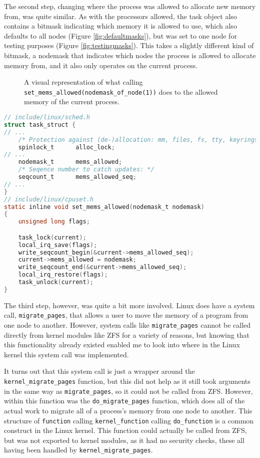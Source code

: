 The second step, changing where the process was allowed to allocate new memory from, was quite similar.
As with the processors allowed, the task object also contains a bitmask indicating which memory it is allowed to use,
which also defaults to all nodes (Figure \ref{fig:defaultmasks}),
but was set to one node for testing purposes (Figure \ref{fig:testingmasks}).
This takes a slightly different kind of bitmask, a nodemask that indicates which nodes the process is allowed
to allocate memory from, and it also only operates on the current process.

\begin{figure}[H]
    \centering
    \resizebox{0.5\linewidth}{!}{}
    \captionsetup{width=0.5\linewidth}
    \caption{A visual representation of what calling \texttt{set\_mems\_allowed(nodemask\_of\_node(1))}
    does to the allowed memory of the current process.}
    \label{fig:setmemsallowed1}
\end{figure}

\singlespacing
\begin{lstlisting}[caption={The relevant chapters of Linux's scheduler code that handle the nodemask
indicating where a process is allowed to allocate memory},label={lst:linux_set_mems_allowed},language=C]
// include/linux/sched.h
struct task_struct {
// ...
	/* Protection against (de-)allocation: mm, files, fs, tty, keyrings, mems_allowed, mempolicy: */
	spinlock_t      alloc_lock;
// ...
	nodemask_t      mems_allowed;
	/* Seqence number to catch updates: */
	seqcount_t      mems_allowed_seq;
// ...
}
// include/linux/cpuset.h
static inline void set_mems_allowed(nodemask_t nodemask)
{
	unsigned long flags;

	task_lock(current);
	local_irq_save(flags);
	write_seqcount_begin(&current->mems_allowed_seq);
	current->mems_allowed = nodemask;
	write_seqcount_end(&current->mems_allowed_seq);
	local_irq_restore(flags);
	task_unlock(current);
}
\end{lstlisting}
\doublespacing
The third step, however, was quite a bit more involved.
Linux does have a system call, \texttt{migrate\_pages}, that allows a user to move the memory of a program from one node
to another.
However, system calls like \texttt{migrate\_pages} cannot be called directly from kernel modules like ZFS 
for a variety of reasons,
but knowing that this functionality already existed enabled me to look into where in the Linux kernel 
this system call was implemented.

It turns out that this system call is just a wrapper around the \texttt{kernel\_migrate\_pages} function, but this did not help
as it still took arguments in the same way as \texttt{migrate\_pages}, so it could not be called from ZFS.
However, within this function was the \texttt{do\_migrate\_pages} function, which does all of the actual work to migrate
all of a process's memory from one node to another.
This structure of \texttt{function} calling \texttt{kernel\_function} calling \texttt{do\_function} is a common construct
in the Linux kernel.
This function could actually be called from ZFS, but was not exported to kernel modules, as it had no security checks, 
these all having been handled by \texttt{kernel\_migrate\_pages}.

